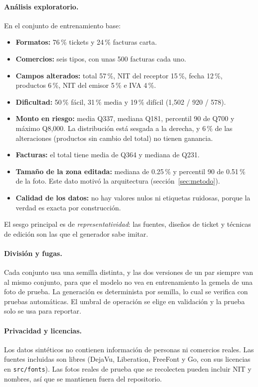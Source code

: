 \documentclass[11pt,letterpaper]{article}
\begin{document}
\paragraph{Análisis exploratorio.} En el conjunto de entrenamiento base:
\begin{itemize}
  \item \textbf{Formatos:} 76\,\% tickets y 24\,\% facturas carta.
  \item \textbf{Comercios:} seis tipos, con unas 500 facturas cada uno.
  \item \textbf{Campos alterados:} total 57\,\%, NIT del receptor 15\,\%, fecha 12\,\%, productos 6\,\%, NIT del emisor 5\,\% e IVA 4\,\%.
  \item \textbf{Dificultad:} 50\,\% fácil, 31\,\% media y 19\,\% difícil (1,502 / 920 / 578).
  \item \textbf{Monto en riesgo:} media Q337, mediana Q181, percentil 90 de Q700 y máximo Q8,000. La distribución está sesgada a la derecha, y 6\,\% de las alteraciones (productos sin cambio del total) no tienen ganancia.
  \item \textbf{Facturas:} el total tiene media de Q364 y mediana de Q231.
  \item \textbf{Tamaño de la zona editada:} mediana de 0.25\,\% y percentil 90 de 0.51\,\% de la foto. Este dato motivó la arquitectura (sección~\ref{sec:metodo}).
  \item \textbf{Calidad de los datos:} no hay valores nulos ni etiquetas ruidosas, porque la verdad es exacta por construcción.
\end{itemize}
El sesgo principal es de \emph{representatividad}: las fuentes, diseños de ticket y técnicas de edición son las que el generador sabe imitar.

\paragraph{División y fugas.} Cada conjunto usa una semilla distinta, y las dos versiones de un par siempre van al mismo conjunto, para que el modelo no vea en entrenamiento la gemela de una foto de prueba. La generación es determinista por semilla, lo cual se verifica con pruebas automáticas. El umbral de operación se elige en validación y la prueba solo se usa para reportar.

\paragraph{Privacidad y licencias.} Los datos sintéticos no contienen información de personas ni comercios reales. Las fuentes incluidas son libres (DejaVu, Liberation, FreeFont y Go, con sus licencias en \texttt{src/fonts}). Las fotos reales de prueba que se recolecten pueden incluir NIT y nombres, así que se mantienen fuera del repositorio.
\end{document}
